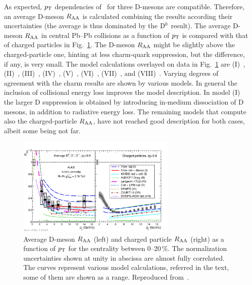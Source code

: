  As expected, $p_{\rm T}$ dependencies of \Raa\ for three D-mesons are compatible. Therefore, an average D-meson $R_{\rm AA}$ is calculated combining the results according their uncertainties (the average is thus dominated by the ${\rm D}^0$ result). The average D-meson $R_{\rm AA}$ in central Pb--Pb collisions as a function of $p_{\rm T}$ is compared with that of charged particles in Fig.~\ref{figks:DmesonRAA}. The D-meson $R_{\rm AA}$ might be slightly above the charged-particle one, hinting at less charm-quark suppression, but the difference, if any, is very small. %
 The model calculations overlayed on data in Fig.~\ref{figks:DmesonRAA} are (I)~\cite{Sharma:2009hn,He:2011pd}, (II)~\cite{Horowitz:2011cv}, (III)~\cite{Horowitz:2011wm}, (IV)~\cite{Alberico:2011zy,Monteno:2011gq}, (V)~\cite{Gossiaux:2009mk,Gossiaux:2010yx}, (VI)~\cite{Fochler:2011en}, (VII)~\cite{Buzzatti:2011vt}, and (VIII)~\cite{Armesto:2005iq}. Varying degrees of agreement with the charm results are shown by various models. In general the inclusion of collisional energy loss improves the model description. In model (I) the larger D suppression is obtained by introducing in-medium dissociation of D mesons, in addition to radiative energy loss. The remaining models that compute also the charged-particle $R_{\rm AA}$, have not reached good description for both cases, albeit some being not far.

\begin{figure}[!ht]
\centering
\includegraphics[width=0.7\textwidth]{heavyflavorfigs/DmesonChargedRAAmodels.pdf}
\caption{Average D-meson $R_{\rm AA}$ (left) and charged particle $R_{\rm AA}$ (right) as a function of $p_{\rm T}$ for the centrality between 0--20\,\%. The normalization uncertainties shown at unity in abscissa are almost fully correlated. The curves represent various model calculations, referred in the text, some of them are shown as a range. Reproduced from~\cite{ALICE:2012ab}.}
\label{figks:DmesonRAA}
\end{figure}

